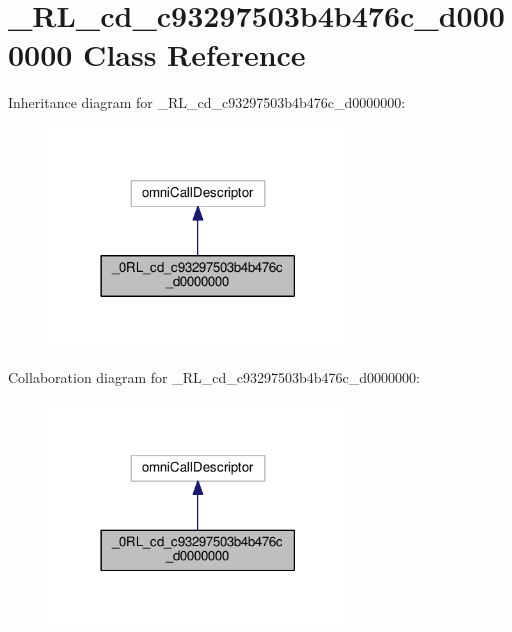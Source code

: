 \hypertarget{class__0_r_l__cd__c93297503b4b476c__d0000000}{}\section{\+\_\+R\+L\+\_\+cd\+\_\+c93297503b4b476c\+\_\+d0000000 Class Reference}
\label{class__0_r_l__cd__c93297503b4b476c__d0000000}


Inheritance diagram for \+\_\+R\+L\+\_\+cd\+\_\+c93297503b4b476c\+\_\+d0000000\+:
\nopagebreak
\begin{figure}[H]
\begin{center}
\leavevmode
\includegraphics[width=225pt]{class__0_r_l__cd__c93297503b4b476c__d0000000__inherit__graph}
\end{center}
\end{figure}


Collaboration diagram for \+\_\+R\+L\+\_\+cd\+\_\+c93297503b4b476c\+\_\+d0000000\+:
\nopagebreak
\begin{figure}[H]
\begin{center}
\leavevmode
\includegraphics[width=225pt]{class__0_r_l__cd__c93297503b4b476c__d0000000__coll__graph}
\end{center}
\end{figure}
